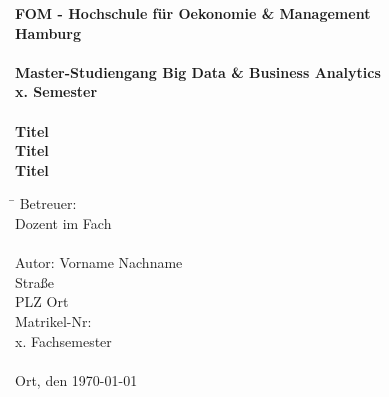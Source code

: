 		\begin{titlepage}
			\begin{center}
				\begin{spacing}{2}
					
					\textbf{\large FOM - Hochschule für Oekonomie \& Management \\
						Hamburg \\
						\ \\
						Master-Studiengang Big Data \& Business Analytics \\
						x. Semester \\
						\ \\
						Titel\\
						Titel\\
						Titel 
						}
				\end{spacing}

				\vfill
				
				\begin{tabbing}
					\hspace{2.5cm}\=\kill
					Betreuer: \>  \\
					\> Dozent im Fach \glqq \grqq \\
					\ \\
					Autor: \> Vorname Nachname \\
					\> Straße \\
					\> PLZ Ort \\
					\> Matrikel-Nr:  \\
					\> x. Fachsemester \\
					\ \\
					Ort, den \today
				\end{tabbing} 
			\end{center}
		\end{titlepage}

%

			\setcounter{tocdepth}{3}
			\setcounter{secnumdepth}{3}		
			\thispagestyle{empty}
			\tableofcontents
			\newpage
			\listoffigures
			\listoftables
			\printglossary[type=acronym,style=listdotted,title=Abkürzungsverzeichnis,toctitle=Abkürzungsverzeichnis] 
			\newpage
			\thispagestyle{empty}